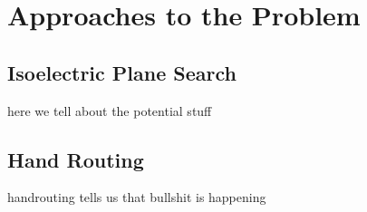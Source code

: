 \chapter{Approaches to the Problem}
\label{cha:approachestotheproblem}

\section{Isoelectric Plane Search}
\label{sec:isolelectricplanesearch}

here we tell about the potential stuff

\section{Hand Routing}
\label{sec:handrouting}

handrouting tells us that bullshit is happening
